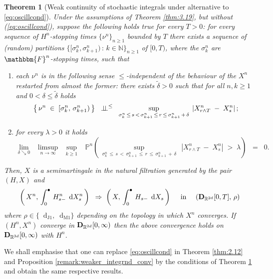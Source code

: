\documentclass[11pt]{article}
\newtheorem{theorem}{Theorem}[section]
\theoremstyle{definition}\newtheorem{example}[theorem]{Example}
\theoremstyle{definition}\newtheorem{counterexample}[theorem]{Counterexample}
\theoremstyle{definition}\newtheorem{remark}[theorem]{Remark}
\theoremstyle{definition}\newtheorem{defi}[theorem]{Definition}
\numberwithin{equation}{section}
\newcommand{\N}{\mathbb{N}}
\newcommand{\R}{\mathbb{R}}
\newcommand{\D}{{\bf D}}											%
\newcommand*\diff{\mathop{}\!\mathrm{d}}								%
\newcommand{\Pro}{\mathbb{P}}										%
\newcommand{\indep}{\perp \!\!\! \perp}									%
\renewcommand{\sup}[1]{\underset{#1}{\operatorname{sup}}\;}					%
\renewcommand{\|}{\; : \, \;}											%
\newcommand{\dJ}{\diff_{\operatorname{J1}}}								%
\newcommand{\dM}{\diff_{\operatorname{M1}}}							%
\begin{document}
\begin{theorem}[Weak continuity of stochastic integrals under alternative to \eqref{eq:oscillcond}] \label{prop:4.36}  
	Under the assumptions of Theorem \ref{thm:3.19}, but without (\ref{eq:oscillcond}), suppose the following holds true for every $T>0$: for every sequence of $H^n$-stopping times $\{\nu^n\}_{n\ge 1}$ bounded by $T$ there exists a sequence of (random) partitions $\{[\sigma_k^{n}, \sigma_{k+1}^{n}) \, : \, k \in \N \}_{n\ge 1}$ of $[0,T)$, where the $\sigma_k^{n}$ are $\mathbbm{F}^n$-stopping times, such that 
	\begin{enumerate}[\quad (a)] 
		\item each $\nu^n$ is in the following sense {\footnotesize $\le$}-independent of the behaviour of the $X^n$ restarted from almost the former: there exists $\tilde \delta>0$ such that for all $n, k \ge 1$ and $0<\delta \le \tilde{\delta}$ holds 
		$$ \left\{ \, \nu^n \; \in \; [ \sigma^{n}_k, \, \sigma^{n}_{k+1} ) \, \right\} \; \; \indep^{\footnotesize \le} \; \; \sup{\sigma^{n}_{k}\, \le \, s \, < \, \sigma^{n}_{k+1} \, \le \, r \, \le \, \sigma^{n}_{k+1} \,  + \, \delta } \, |X^n_{r\wedge T} \; - \; X^n_{s}|  \, ; $$
		\item for every $\lambda>0$ it holds
		$$ \lim\limits_{\delta \searrow 0} \; \; \limsup\limits_{n\to \infty} \; \; \sup{k \ge 1} \; \; \Pro^n\left(\, \sup{\sigma^{n}_{k}\, \le \, s \, < \, \sigma^{n}_{k+1} \, \le \, r \, \le \, \sigma^{n}_{k+1} \,  + \, \delta } \, |X^n_{r\wedge T} \; - \; X^n_{s}| \; > \; \lambda \right) \; \; = \; \; 0.$$
	\end{enumerate}
	Then, $X$ is a semimartingale in the natural filtration generated by the pair $(H, X)$ and
	$$\left( \, X^n, \, \int_0^\bullet \, H^n_{s-} \; \diff X^n_s\, \right) \;  \; \Rightarrow \; \left( \, X, \, \int_0^\bullet \, H_{s-} \; \diff X_s\, \right) \quad \text{ in } \quad (\D_{\R^{2d}}[0,T], \, \rho)$$
	where $\rho \in \{\dJ,\dM\}$ depending on the topology in which $X^n$ converges. If $(H^n, X^n)$ converge in $\D_{\R^{2d}}[0,\infty)$ then the above convergence holds on $\D_{\R^{3d}}[0,\infty)$ with $H^n$.
\end{theorem}

We shall emphasise that one can replace \eqref{eq:oscillcond} in Theorem \ref{thm:2.12} and Proposition \ref{remark:weaker_integrnd_conv} by the conditions of Theorem \ref{prop:4.36} and obtain the same respective results. 
\end{document}
